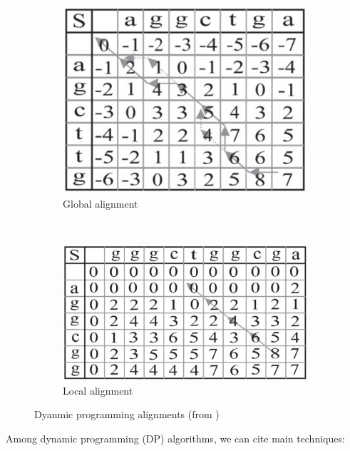 \begin{figure}[ht!]
	\centering
	\begin{subfigure}[t]{0.5\textwidth}
		\centering
		\includegraphics[height=0.5\textwidth]{global_align}
		\caption{Global alignment}
		\label{fig:global_align}
	\end{subfigure}%
	~ 
	\begin{subfigure}[t]{0.5\textwidth}
		\centering
		\includegraphics[height=0.5\textwidth]{local_align}
		\caption{Local alignment}
		\label{fig:local_align}
	\end{subfigure}
	\caption{Dyanmic programming alignments (from \cite{Aluru:2005:HCM:1121650}) }
	\label{fig:dpmatrix}
\end{figure}



Among dynamic programming (DP) algorithms, we can cite main techniques:

